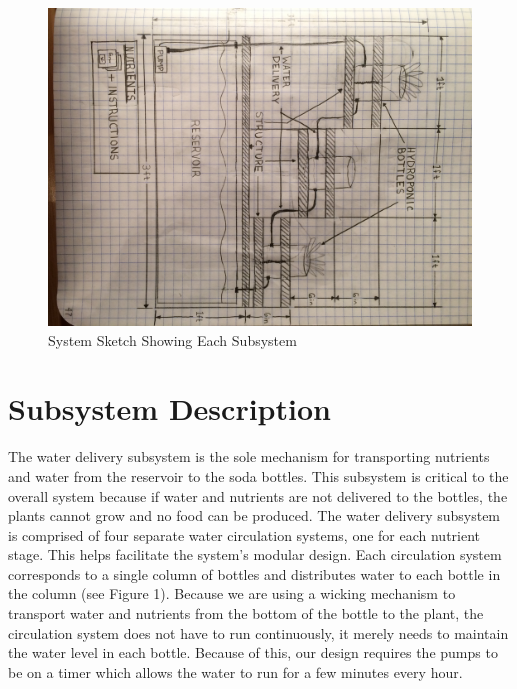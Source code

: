 \documentclass[12pt]{article}
\begin{document}
{    \pagebreak
    \begin{figure}[H]
        \centering
        \includegraphics[width=163mm]{resources/system-overview.jpg}
        \caption{System Sketch Showing Each Subsystem}
    \end{figure}
}


\section{Subsystem Description}


The water delivery subsystem is the sole mechanism for transporting nutrients and water from
the reservoir to the soda bottles. This subsystem is critical to the overall system because if water
and nutrients are not delivered to the bottles, the plants cannot grow and no food can be produced.
The water delivery subsystem is comprised of four separate water circulation systems, one for each
nutrient stage. This helps facilitate the system's modular design. Each circulation system
corresponds to a single column of bottles and distributes water to each bottle in the column (see
Figure 1). Because we are using a wicking mechanism to transport water and nutrients from the bottom
of the bottle to the plant, the circulation system does not have to run continuously, it merely
needs to maintain the water level in each bottle. Because of this, our design requires the pumps to
be on a timer which allows the water to run for a few minutes every hour.
\end{document}
